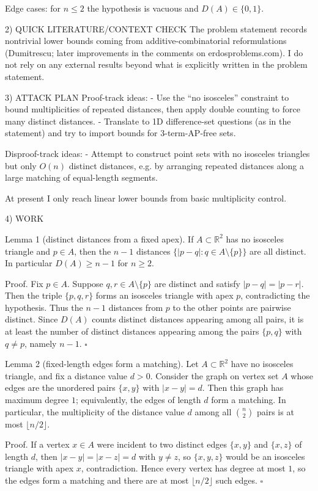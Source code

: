 Edge cases: for $n\le 2$ the hypothesis is vacuous and $D(A)\in\{0,1\}$.

2) QUICK LITERATURE/CONTEXT CHECK
The problem statement records nontrivial lower bounds coming from additive-combinatorial reformulations
(Dumitrescu; later improvements in the comments on erdosproblems.com). I do not rely on any external
results beyond what is explicitly written in the problem statement.

3) ATTACK PLAN
Proof-track ideas:
- Use the ``no isosceles'' constraint to bound multiplicities of repeated distances, then apply
  double counting to force many distinct distances.
- Translate to 1D difference-set questions (as in the statement) and try to import bounds for
  3-term-AP-free sets.

Disproof-track ideas:
- Attempt to construct point sets with no isosceles triangles but only $O(n)$ distinct distances,
  e.g. by arranging repeated distances along a large matching of equal-length segments.

At present I only reach linear lower bounds from basic multiplicity control.

4) WORK

Lemma 1 (distinct distances from a fixed apex).
If $A\subset\mathbb{R}^2$ has no isosceles triangle and $p\in A$, then the $n-1$ distances
$\{|p-q|: q\in A\setminus\{p\}\}$ are all distinct. In particular $D(A)\ge n-1$ for $n\ge 2$.

Proof.
Fix $p\in A$. Suppose $q,r\in A\setminus\{p\}$ are distinct and satisfy $|p-q|=|p-r|$.
Then the triple $\{p,q,r\}$ forms an isosceles triangle with apex $p$, contradicting the hypothesis.
Thus the $n-1$ distances from $p$ to the other points are pairwise distinct.
Since $D(A)$ counts distinct distances appearing among all pairs, it is at least the number of distinct
distances appearing among the pairs $\{p,q\}$ with $q\neq p$, namely $n-1$. $\square$

Lemma 2 (fixed-length edges form a matching).
Let $A\subset\mathbb{R}^2$ have no isosceles triangle, and fix a distance value $d>0$.
Consider the graph on vertex set $A$ whose edges are the unordered pairs $\{x,y\}$ with $|x-y|=d$.
Then this graph has maximum degree $1$; equivalently, the edges of length $d$ form a matching.
In particular, the multiplicity of the distance value $d$ among all $\binom n2$ pairs is at most
$\lfloor n/2\rfloor$.

Proof.
If a vertex $x\in A$ were incident to two distinct edges $\{x,y\}$ and $\{x,z\}$ of length $d$,
then $|x-y|=|x-z|=d$ with $y\neq z$, so $\{x,y,z\}$ would be an isosceles triangle with apex $x$,
contradiction. Hence every vertex has degree at most $1$, so the edges form a matching and there are at
most $\lfloor n/2\rfloor$ such edges. $\square$

